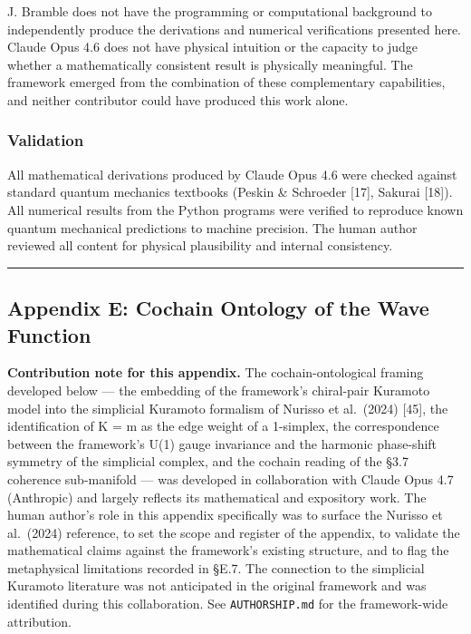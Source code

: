 \documentclass[
]{article}
\begin{document}
J. Bramble does not have the programming or computational background to
independently produce the derivations and numerical verifications
presented here. Claude Opus 4.6 does not have physical intuition or the
capacity to judge whether a mathematically consistent result is
physically meaningful. The framework emerged from the combination of
these complementary capabilities, and neither contributor could have
produced this work alone.

\subsubsection{Validation}\label{validation}

All mathematical derivations produced by Claude Opus 4.6 were checked
against standard quantum mechanics textbooks (Peskin \& Schroeder
{[}17{]}, Sakurai {[}18{]}). All numerical results from the Python
programs were verified to reproduce known quantum mechanical predictions
to machine precision. The human author reviewed all content for physical
plausibility and internal consistency.

\begin{center}\rule{0.5\linewidth}{0.5pt}\end{center}

\subsection{Appendix E: Cochain Ontology of the Wave
Function}\label{appendix-e-cochain-ontology-of-the-wave-function}

\textbf{Contribution note for this appendix.} The cochain-ontological
framing developed below --- the embedding of the framework's chiral-pair
Kuramoto model into the simplicial Kuramoto formalism of Nurisso et
al.~(2024) {[}45{]}, the identification of K = m as the edge weight of a
1-simplex, the correspondence between the framework's U(1) gauge
invariance and the harmonic phase-shift symmetry of the simplicial
complex, and the cochain reading of the §3.7 coherence sub-manifold ---
was developed in collaboration with Claude Opus 4.7 (Anthropic) and
largely reflects its mathematical and expository work. The human
author's role in this appendix specifically was to surface the Nurisso
et al.~(2024) reference, to set the scope and register of the appendix,
to validate the mathematical claims against the framework's existing
structure, and to flag the metaphysical limitations recorded in §E.7.
The connection to the simplicial Kuramoto literature was not anticipated
in the original framework and was identified during this collaboration.
See \texttt{AUTHORSHIP.md} for the framework-wide attribution.
\end{document}

